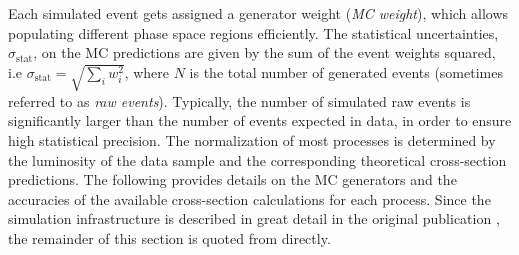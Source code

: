 Each simulated event gets assigned a generator weight (\emph{MC weight}), which allows populating different phase space regions efficiently.
The statistical uncertainties, $\sigma_\mathrm{stat}$, on the MC predictions are given by the sum of the event weights squared, i.e $\sigma_\mathrm{stat} = \sqrt{\sum_i w_i^2}$, where $N$ is the total number of generated events (sometimes referred to as \emph{raw events}). Typically, the number of simulated raw events is significantly larger than the number of events expected in data, in order to ensure high statistical precision.
The normalization of most processes is determined by the luminosity of the data sample and the corresponding theoretical cross-section predictions.
The following provides details on the MC generators and the accuracies of the available cross-section calculations for each process. 
Since the simulation infrastructure is described in great detail in the original publication \cite{HWWPaper}, the remainder of this section is quoted from  directly.
\FloatBarrier
